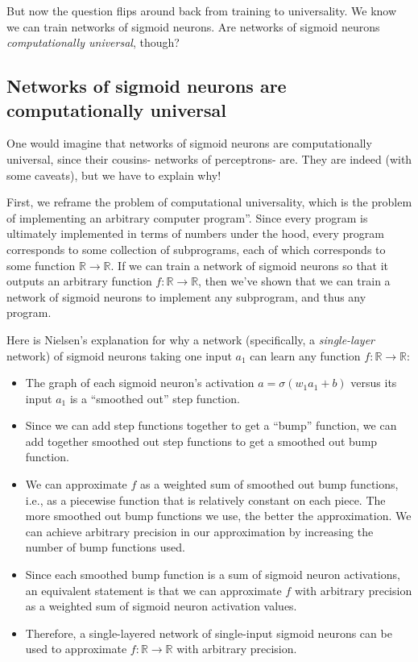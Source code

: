 \documentclass{article}
\begin{document}
	But now the question flips around back from training to universality. We know we can train networks of sigmoid neurons. Are networks of sigmoid neurons \textit{computationally universal}, though?
	
	\subsection*{Networks of sigmoid neurons are computationally universal}
	
	One would imagine that networks of sigmoid neurons are computationally universal, since their cousins- networks of perceptrons- are. They are indeed (with some caveats), but we have to explain why!
	
	First, we reframe the problem of computational universality, which is the problem of implementing an arbitrary computer program''. Since every program is ultimately implemented in terms of numbers under the hood, every program corresponds to some collection of subprograms, each of which corresponds to some function $\mathbb{R} \rightarrow \mathbb{R}$. If we can train a network of sigmoid neurons so that it outputs an arbitrary function $f:\mathbb{R} \rightarrow \mathbb{R}$, then we've shown that we can train a network of sigmoid neurons to implement any subprogram, and thus any program.
	
	Here is Nielsen's explanation for why a network (specifically, a \textit{single-layer} network) of sigmoid neurons taking one input $a_1$  can learn any function $f:\mathbb{R} \rightarrow \mathbb{R}$:
	
	\begin{itemize}
		\item The graph of each sigmoid neuron's activation $a = \sigma(w_1 a_1 + b)$ versus its input $a_1$ is a ``smoothed out'' step function.
		\item Since we can add step functions together to get a ``bump'' function, we can add together smoothed out step functions to get a smoothed out bump function.
		\item We can approximate $f$ as a weighted sum of smoothed out bump functions, i.e., as a piecewise function that is relatively constant on each piece. The more smoothed out bump functions we use, the better the approximation. We can achieve arbitrary precision in our approximation by increasing the number of bump functions used.
		\item Since each smoothed bump function is a sum of sigmoid neuron activations, an equivalent statement is that we can approximate $f$ with arbitrary precision as a weighted sum of sigmoid neuron activation values.
		\item Therefore, a single-layered network of single-input sigmoid neurons can be used to approximate $f:\mathbb{R} \rightarrow \mathbb{R}$ with arbitrary precision.
	\end{itemize}
	
\end{document}
